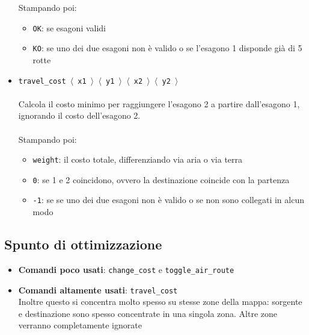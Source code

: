 \documentclass{article}
\begin{document}
\begin{itemize}
    Stampando poi:
    \begin{itemize}
        \item \texttt{OK}: se esagoni validi
        \item \texttt{KO}: se uno dei due esagoni non è valido o se l'esagono 1 disponde già di 5 rotte
    \end{itemize}

    \item \texttt{travel\_cost $\langle$ x1 $\rangle$ $\langle$ y1 $\rangle$ $\langle$ x2 $\rangle$ $\langle$ y2 $\rangle$}\\\\
    Calcola il costo minimo per raggiungere l'esagono 2 a partire dall'esagono 1, ignorando il costo dell'esagono 2.\\\\
    Stampando poi:
    \begin{itemize}
        \item \texttt{weight}: il costo totale, differenziando via aria o via terra
        \item \texttt{0}: se 1 e 2 coincidono, ovvero la destinazione coincide con la partenza
        \item \texttt{-1}: se se uno dei due esagoni non è valido o se non sono collegati in alcun modo
    \end{itemize}
\end{itemize}

\subsection{Spunto di ottimizzazione}
\begin{itemize}
    \item \textbf{Comandi poco usati}: \texttt{change\_cost} e \texttt{toggle\_air\_route}
    \item \textbf{Comandi altamente usati}: \texttt{travel\_cost}\\
    Inoltre questo si concentra molto spesso su stesse zone della mappa: sorgente e destinazione sono spesso concentrate in una singola zona. Altre zone verranno completamente ignorate
\end{itemize}
\end{document}
